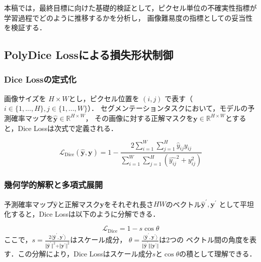 \documentclass[10pt, a4paper, twocolumn]{jarticle}
\begin{document}
本稿では，最終目標に向けた基礎的検証として，ピクセル単位の不確実性指標が学習過程でどのように推移するかを分析し，
画像難易度の指標としての妥当性を検証する．

\subsection{PolyDice Lossによる損失形状制御}

\subsubsection{Dice Lossの定式化}
画像サイズを $H \times W$とし，ピクセル位置を $(i, j)$ で表す（$i \in \{1, ..., H\}, j \in \{1, ..., W\}$）．
セグメンテーションタスクにおいて，モデルの予測確率マップを$\hat{\mathbf{y}} \in \mathbb R ^ {H \times W}$，
その画像に対する正解マスクを$\mathbf{y} \in \mathbb R ^ {H \times W}$とすると，Dice Lossは次式で定義される．

\begin{equation}
  \mathcal{L}_{\text{Dice}}(\hat{\mathbf{y}}, \mathbf{y}) = 1 - \frac{2 \sum_{i=1}^{W} \sum_{j=1}^{H} \hat{y}_{ij} y_{ij}}{\sum_{i=1}^{W} \sum_{j=1}^{H}(\hat{y_{ij}} ^ 2 + y_{ij} ^ 2)}
\end{equation}

\subsubsection{幾何学的解釈と多項式展開}

予測確率マップ$\hat{\mathbf{y}}$と正解マスク$\mathbf{y}$をそれぞれ長さ$HW$のベクトル$\hat{\mathbf{y}} ^ {\prime}, {\mathbf{y}} ^ {\prime}$
として平坦化すると，Dice Lossは以下のように分解できる．

\begin{equation}
  \mathcal{L}_{\text{Dice}} = 1 - s \cos  \theta
\end{equation}
ここで，$s = \frac{2 \langle \hat{\mathbf{y}} ^ {\prime}, {\mathbf{y}} ^ {\prime} \rangle}{\Vert \hat{\mathbf{y}} ^ {\prime} \Vert ^ 2 + \Vert {\mathbf{y}} ^ {\prime} \Vert ^ 2}$はスケール成分，
$\theta = \frac{\langle \hat{\mathbf{y}} ^ {\prime}, {\mathbf{y}} ^ {\prime} \rangle}{\Vert \hat{\mathbf{y}} ^ {\prime} \Vert \Vert {\mathbf{y}} ^ {\prime} \Vert}$は2つの
ベクトル間の角度を表す．この分解により，Dice Lossはスケール成分$s$と$\cos \theta$の積として理解できる．
\end{document}
